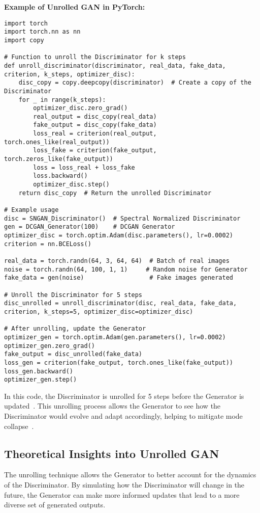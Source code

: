 \textbf{Example of Unrolled GAN in PyTorch:}

\begin{lstlisting}[style=python]
import torch
import torch.nn as nn
import copy

# Function to unroll the Discriminator for k steps
def unroll_discriminator(discriminator, real_data, fake_data, criterion, k_steps, optimizer_disc):
    disc_copy = copy.deepcopy(discriminator)  # Create a copy of the Discriminator
    for _ in range(k_steps):
        optimizer_disc.zero_grad()
        real_output = disc_copy(real_data)
        fake_output = disc_copy(fake_data)
        loss_real = criterion(real_output, torch.ones_like(real_output))
        loss_fake = criterion(fake_output, torch.zeros_like(fake_output))
        loss = loss_real + loss_fake
        loss.backward()
        optimizer_disc.step()
    return disc_copy  # Return the unrolled Discriminator

# Example usage
disc = SNGAN_Discriminator()  # Spectral Normalized Discriminator
gen = DCGAN_Generator(100)    # DCGAN Generator
optimizer_disc = torch.optim.Adam(disc.parameters(), lr=0.0002)
criterion = nn.BCELoss()

real_data = torch.randn(64, 3, 64, 64)  # Batch of real images
noise = torch.randn(64, 100, 1, 1)     # Random noise for Generator
fake_data = gen(noise)                  # Fake images generated

# Unroll the Discriminator for 5 steps
disc_unrolled = unroll_discriminator(disc, real_data, fake_data, criterion, k_steps=5, optimizer_disc=optimizer_disc)

# After unrolling, update the Generator
optimizer_gen = torch.optim.Adam(gen.parameters(), lr=0.0002)
optimizer_gen.zero_grad()
fake_output = disc_unrolled(fake_data)
loss_gen = criterion(fake_output, torch.ones_like(fake_output))
loss_gen.backward()
optimizer_gen.step()
\end{lstlisting}

In this code, the Discriminator is unrolled for 5 steps before the Generator is updated~\cite{metz2016unrolled}. This unrolling process allows the Generator to see how the Discriminator would evolve and adapt accordingly, helping to mitigate mode collapse~\cite{wang2022unrolled}.

\subsection{Theoretical Insights into Unrolled GAN}
The unrolling technique allows the Generator to better account for the dynamics of the Discriminator. By simulating how the Discriminator will change in the future, the Generator can make more informed updates that lead to a more diverse set of generated outputs.

